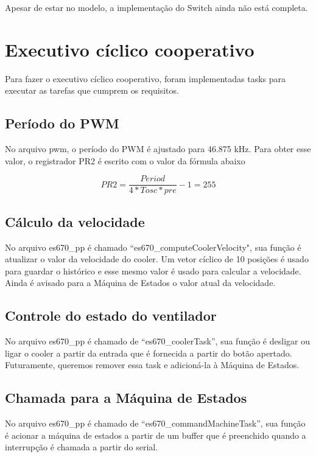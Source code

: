 \documentclass{article}
\begin{document}
Apesar de estar no modelo, a implementação do Switch ainda não está completa.


\section{Executivo cíclico cooperativo}

Para fazer o executivo cíclico cooperativo, foram implementadas tasks para executar as tarefas que cumprem os requisitos.

\subsection{Período do PWM}
No arquivo pwm, o período do PWM é ajustado para 46.875 kHz. Para obter esse valor, o registrador PR2 é escrito com o valor da fórmula abaixo

\begin{equation}
PR2 = \frac{Period}{4*Tosc*pre}-1 = 255
\end{equation}

\subsection{Cálculo da velocidade}
No arquivo es670\_pp é chamado ``es670\_computeCoolerVelocity", sua função é atualizar o valor da velocidade do cooler. Um vetor cíclico de 10 posições é usado para guardar o histórico e esse mesmo valor é usado para calcular a velocidade. Ainda é avisado para a Máquina de Estados o valor atual da velocidade.

\subsection{Controle do estado do ventilador}
No arquivo es670\_pp é chamado de ``es670\_coolerTask'', sua função é desligar ou ligar o cooler a partir da entrada que é fornecida a partir do botão apertado.
Futuramente, queremos remover essa task e adicioná-la à Máquina de Estados.

\subsection{Chamada para a Máquina de Estados}
No arquivo es670\_pp é chamado de ``es670\_commandMachineTask'', sua função é acionar a máquina de estados a partir de um buffer que é preenchido quando a interrupção é chamada a partir do serial.
\end{document}
